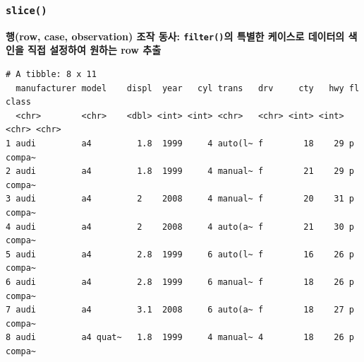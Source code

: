 \documentclass[
  11pt,
]{krantz}
\makeatletter
\newenvironment{Shaded}{\begin{snugshade}}{\end{snugshade}}
\newcommand{\CommentTok}[1]{\textcolor[rgb]{0.37,0.37,0.37}{\textit{#1}}}
\newcommand{\DecValTok}[1]{\textcolor[rgb]{0.06,0.06,0.06}{#1}}
\newcommand{\KeywordTok}[1]{\textcolor[rgb]{0.27,0.27,0.27}{\textbf{#1}}}
\newcommand{\NormalTok}[1]{#1}
\newcommand{\OperatorTok}[1]{\textcolor[rgb]{0.43,0.43,0.43}{\textbf{#1}}}
\newcommand{\StringTok}[1]{\textcolor[rgb]{0.5,0.5,0.5}{#1}}
\newenvironment{kframe}{%
\medskip{}
\setlength{\fboxsep}{.8em}
 \def\at@end@of@kframe{}%
 \ifinner\ifhmode%
  \def\at@end@of@kframe{\end{minipage}}%
  \begin{minipage}{\columnwidth}%
 \fi\fi%
 \def\FrameCommand##1{\hskip\@totalleftmargin \hskip-\fboxsep
 \colorbox{shadecolor}{##1}\hskip-\fboxsep
     \hskip-\linewidth \hskip-\@totalleftmargin \hskip\columnwidth}%
 \MakeFramed {\advance\hsize-\width
   \@totalleftmargin\z@ \linewidth\hsize
   \@setminipage}}%
 {\par\unskip\endMakeFramed%
 \at@end@of@kframe}
\renewenvironment{quote}{\begin{kframe}}{\end{kframe}}
\makeatother
\begin{document}
\hypertarget{dplyr-slice}{%
\subsubsection*{\texorpdfstring{\texttt{slice()}}{slice()}}\label{dplyr-slice}}


\begin{quote}
\textbf{행(row, case, observation) 조작 동사: \texttt{filter()}의 특별한 케이스로 데이터의 색인을 직접 설정하여 원하는 row 추출}
\end{quote}

\footnotesize

\begin{Shaded}
\end{Shaded}

\begin{verbatim}
# A tibble: 8 x 11
  manufacturer model    displ  year   cyl trans   drv     cty   hwy fl    class 
  <chr>        <chr>    <dbl> <int> <int> <chr>   <chr> <int> <int> <chr> <chr> 
1 audi         a4         1.8  1999     4 auto(l~ f        18    29 p     compa~
2 audi         a4         1.8  1999     4 manual~ f        21    29 p     compa~
3 audi         a4         2    2008     4 manual~ f        20    31 p     compa~
4 audi         a4         2    2008     4 auto(a~ f        21    30 p     compa~
5 audi         a4         2.8  1999     6 auto(l~ f        16    26 p     compa~
6 audi         a4         2.8  1999     6 manual~ f        18    26 p     compa~
7 audi         a4         3.1  2008     6 auto(a~ f        18    27 p     compa~
8 audi         a4 quat~   1.8  1999     4 manual~ 4        18    26 p     compa~
\end{verbatim}

\begin{Shaded}
\end{Shaded}
\end{document}
